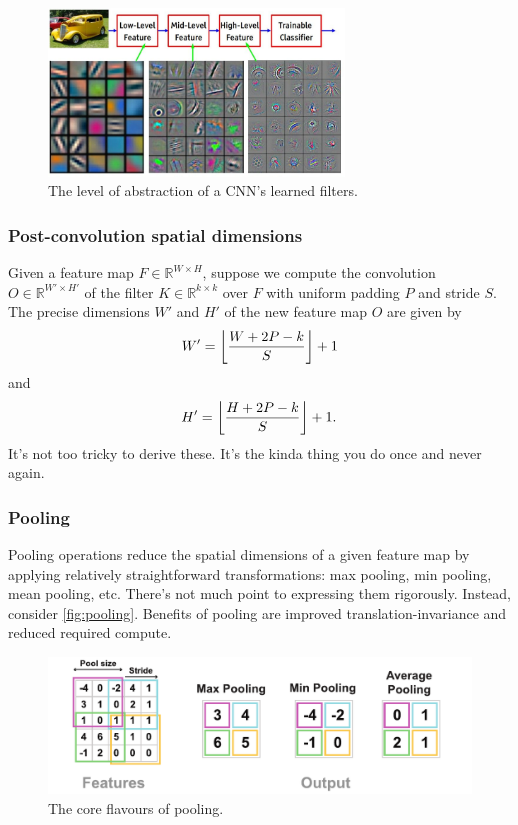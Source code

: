 \documentclass[11pt]{article}
\begin{document}
\begin{figure}[t]
    \centering
    \includegraphics[width=0.7\textwidth]{./figures/neural_nets/CNN_feature_levels.png}
    \caption{The level of abstraction of a CNN's learned filters. }
    \label{fig:filter_levels}
\end{figure}

\subsubsection*{Post-convolution spatial dimensions}
Given a feature map $F\in\mathbb{R}^{W\times H}$, suppose we compute the convolution $O\in\mathbb{R}^{W'\times H'}$ of the filter $K\in\mathbb{R}^{k\times k}$ over $F$ with uniform padding $P$ and stride $S$. The precise dimensions $W'$ and $H'$ of the new feature map $O$ are given by
$$
W'
=
\left\lfloor\frac{W+2P-k}{S}\right\rfloor+1
$$
and
$$
H'
=
\left\lfloor\frac{H+2P-k}{S}\right\rfloor+1.
$$
It's not too tricky to derive these. It's the kinda thing you do once and never again.

\subsubsection{Pooling}
Pooling operations reduce the spatial dimensions of a given feature map by applying relatively straightforward transformations: max pooling, min pooling, mean pooling, etc. There's not much point to expressing them rigorously. Instead, consider \autoref{fig:pooling}. Benefits of pooling are improved translation-invariance and reduced required compute.

\begin{figure}[ht]
    \centering
    \includegraphics[width=1\textwidth]{./figures/neural_nets/CNN_pooling.pdf}
    \caption{The core flavours of pooling. }
    \label{fig:pooling}
\end{figure}
\end{document}
